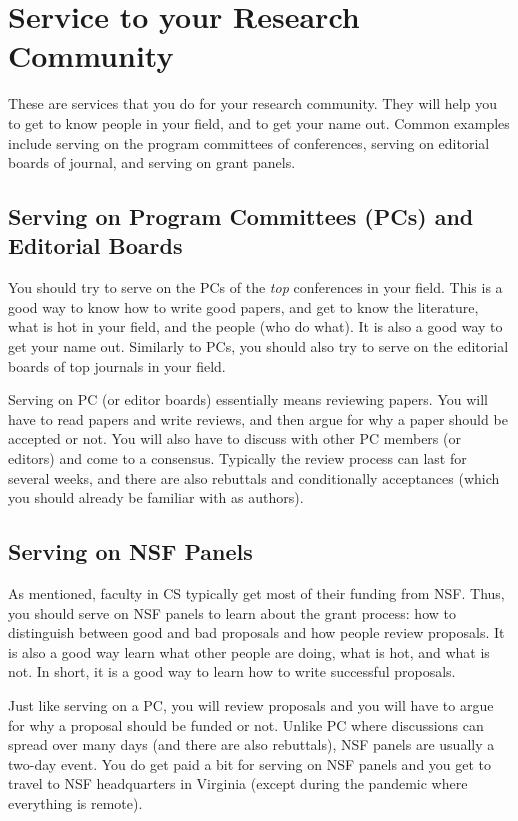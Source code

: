 \documentclass[oneside,11pt,dvipsnames]{book}
\begin{document}
\section{Service to your Research Community}

These are services that you do for your research community. They will help you to get to know people in your field, and to get your name out.  Common examples include serving on the program committees of conferences, serving on editorial boards of journal, and serving on grant panels.

\subsection{Serving on Program Committees (PCs) and Editorial Boards} You should try to serve on the PCs  of the \emph{top} conferences in your field. This is a good way to know how to write good papers, and get to know the literature, what is hot in your field, and the people (who do what). It is also a good way to get your name out.  Similarly to PCs, you should also try to serve on the editorial boards of top journals in your field.

Serving on PC (or editor boards) essentially means reviewing papers. You will have to read papers and write reviews, and then argue for why a paper should be accepted or not.  You will also have to discuss with other PC members (or editors) and come to a consensus.  Typically the review process can last for several weeks, and there are also rebuttals and conditionally acceptances (which you should already be familiar with as authors).



\subsection{Serving on NSF Panels} As mentioned, faculty in CS typically get most of their funding from NSF. Thus, you should serve on NSF panels to learn about the grant process: how to distinguish between good and bad proposals and how people review proposals.
It is also a good way learn what other people are doing, what is hot, and what is not. In short, it is a good way to learn how to write successful proposals.

Just like serving on a PC, you will review proposals and you will have to argue for why a proposal should be funded or not.  Unlike PC where discussions can spread over many days (and there are also rebuttals), NSF panels are usually a two-day event.  You do get paid a bit for serving on NSF panels and you get to travel to NSF headquarters in Virginia (except during the pandemic where everything is remote).
\end{document}
